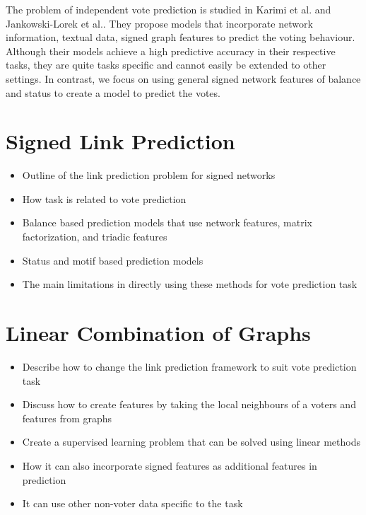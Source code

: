 The problem of independent vote prediction is studied in Karimi et al. \cite{karimi2019multicongress} and Jankowski-Lorek et al.\cite{jankowski-lorek2013MBSN}. They propose models that incorporate network information, textual data, signed graph features to predict the voting behaviour. Although their models achieve a high predictive accuracy in their respective tasks, they are quite tasks specific and cannot easily be extended to other settings. In contrast, we focus on using general signed network features of balance and status to create a model to predict the votes. 


\section{Signed Link Prediction}
\label{sec:link-prediction}


\begin{itemize}
    \item Outline of the link prediction problem for signed networks \cite{liben-nowell2007the,leskovec2010signed}
    \item How task is related to vote prediction 
    \item Balance based prediction models that use network features, matrix factorization, and triadic features \cite{leskovec2010predicting,chiang2011exploiting,agrawal2013link,gu2019link,Jiliang2015Negative,Shuang-Hong2012Friend}
    \item Status and motif based prediction models \cite{Liu2019LinkPrediction}
    \item The main limitations in directly using these methods for vote prediction task
\end{itemize}

\section{Linear Combination of Graphs}
\label{sec:linear-combination-theory}
\begin{itemize}
    \item Describe how to change the link prediction framework to suit vote prediction task
    \item Discuss how to create features by taking the local neighbours of a voters and features from graphs 
    \item Create a supervised learning problem that can be solved using linear methods
    \item How it can also incorporate signed features as additional features in prediction
    \item It can use other non-voter data specific to the task
\end{itemize}

